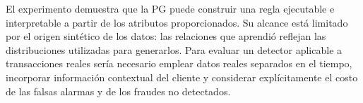 \documentclass[14pt,twoside]{article}
\begin{document}
El experimento demuestra que la PG puede construir una regla ejecutable e interpretable a partir de los atributos proporcionados. Su alcance está limitado por el origen sintético de los datos: las relaciones que aprendió reflejan las distribuciones utilizadas para generarlos. Para evaluar un detector aplicable a transacciones reales sería necesario emplear datos reales separados en el tiempo, incorporar información contextual del cliente y considerar explícitamente el costo de las falsas alarmas y de los fraudes no detectados.
\end{document}
